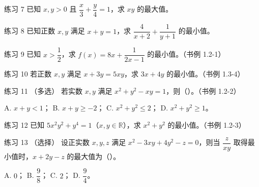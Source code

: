 \begin{problem}{练习 7}
已知 $x,y>0$ 且 $\dfrac x3+\dfrac y4=1$，求 $xy$ 的最大值。
\end{problem}

\begin{problem}{练习 8 \starred}
已知正数 $x,y$ 满足 $x+y=1$，求 $\dfrac{4}{x+2}+\dfrac{1}{y+1}$ 的最小值。
\end{problem}

\begin{problem}{练习 9}
已知 $x>\dfrac12$，求 $f(x)=8x+\dfrac{1}{2x-1}$ 的最小值。（书例 1.2-1）
\end{problem}

\begin{problem}{练习 10}
若正数 $x,y$ 满足 $x+3y=5xy$，求 $3x+4y$ 的最小值。（书例 1.3-4）
\end{problem}

\begin{problem}{练习 11 \starred（多选）}
若实数 $x,y$ 满足 $x^2+y^2-xy=1$，则（\quad）。（书例 1.2-2）

A. $x+y<1$；\quad
B. $x+y\ge -2$；\quad
C. $x^2+y^2\le 2$；\quad
D. $x^2+y^2\ge 1$。
\end{problem}

\begin{problem}{练习 12 \starred\starred}
已知 $5x^2y^2+y^4=1$（$x,y\in\mathbb{R}$），求 $x^2+y^2$ 的最小值。（书例 1.2-3）
\end{problem}

\begin{problem}{练习 13 \starred（选择）}
设正实数 $x,y,z$ 满足 $x^2-3xy+4y^2-z=0$，则当 $\dfrac{z}{xy}$ 取得最小值时，$x+2y-z$ 的最大值为（\quad）。

A. $0$；\quad
B. $\dfrac98$；\quad
C. $2$；\quad
D. $\dfrac94$。
\end{problem}

\clearpage
